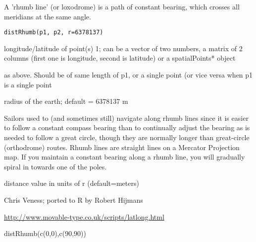 \begin{Description}\relax
A 'rhumb line' (or loxodrome) is a path of constant bearing, which crosses all meridians at the same angle.
\end{Description}
\begin{Usage}
\begin{verbatim}
distRhumb(p1, p2, r=6378137)
\end{verbatim}
\end{Usage}
\begin{Arguments}
\begin{ldescription}
\item[\code{p1}] longitude/latitude of point(s) 1; can be a vector of two numbers, a matrix of 2 columns (first one is longitude, second is latitude) or a spatialPoints* object
\item[\code{p2}] as above. Should be of same length of p1, or a single point (or vice versa when p1 is a single point
\item[\code{r}] radius of the earth; default = 6378137 m
\end{ldescription}
\end{Arguments}
\begin{Details}\relax
Sailors used to (and sometimes still) navigate along rhumb lines since it is easier to follow a constant compass bearing than to continually adjust the bearing as is needed to follow a great circle, though they are normally longer than great-circle (orthodrome) routes. Rhumb lines are straight lines on a Mercator Projection map.
If you maintain a constant bearing along a rhumb line, you will gradually spiral in towards one of the poles.
\end{Details}
\begin{Value}
distance value in units of r (default=meters)
\end{Value}
\begin{Author}\relax
Chris Veness; ported to R by Robert Hijmans
\end{Author}
\begin{References}\relax
\url{http://www.movable-type.co.uk/scripts/latlong.html}
\end{References}
\begin{SeeAlso}\relax
{}
\end{SeeAlso}
\begin{Examples}
\begin{ExampleCode}
distRhumb(c(0,0),c(90,90))
\end{ExampleCode}
\end{Examples}

